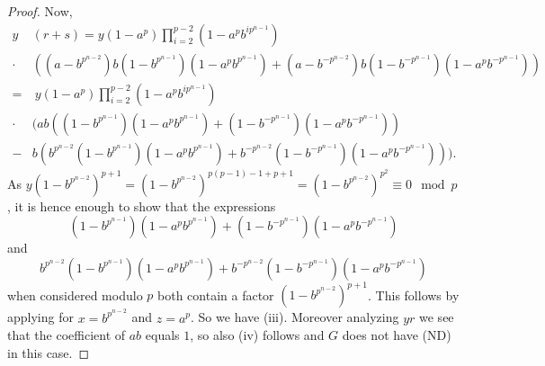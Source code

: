 \documentclass[a4paper,10pt]{amsart}
\theoremstyle{definition}
\theoremstyle{remark}
\begin{document}
\begin{proof}
Now,
\begin{align*}
y&(r+s) = y(1-a^p)\prod_{i=2}^{p-2}(1-a^pb^{ip^{n-1}}) \\
\cdot& ((a-b^{p^{n-2}})b(1-b^{p^{n-1}})(1-a^pb^{p^{n-1}}) + (a-b^{-p^{n-2}})b(1-b^{-p^{n-1}})(1-a^pb^{-p^{n-1}})) \\
=& \ y(1-a^p)\prod_{i=2}^{p-2}(1-a^pb^{ip^{n-1}}) \\
\cdot &(ab((1-b^{p^{n-1}})(1-a^pb^{p^{n-1}}) + (1-b^{-p^{n-1}})(1-a^pb^{-p^{n-1}})) \\
-& b(b^{p^{n-2}}(1-b^{p^{n-1}})(1-a^pb^{p^{n-1}}) + b^{-p^{n-2}}(1-b^{-p^{n-1}})(1-a^pb^{-p^{n-1}}))).
\end{align*}
As $y(1-b^{p^{n-2}})^{p+1} = (1-b^{p^{n-2}})^{p(p-1)-1+p+1} = (1-b^{p^{n-2}})^{p^2} \equiv 0 \mod p$, it is hence enough to show that the expressions
\begin{equation}\label{eq:con1OddpCase2}
(1-b^{p^{n-1}})(1-a^pb^{p^{n-1}}) + (1-b^{-p^{n-1}})(1-a^pb^{-p^{n-1}})
\end{equation}
and 
\begin{equation}\label{eq:con2OddpCase2}
b^{p^{n-2}}(1-b^{p^{n-1}})(1-a^pb^{p^{n-1}}) + b^{-p^{n-2}}(1-b^{-p^{n-1}})(1-a^pb^{-p^{n-1}})
\end{equation}
when considered modulo $p$ both contain a factor $(1-b^{p^{n-2}})^{p+1}$. This follows by applying  for $x = b^{p^{n-2}}$ and $z = a^p$. So we have (iii). Moreover analyzing $yr$ we see that the coefficient of $ab$ equals $1$, so also (iv) follows and $G$ does not have (ND) in this case.
\end{proof}
\end{document}
